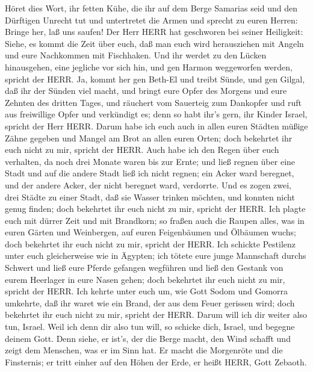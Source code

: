  Höret dies Wort, ihr fetten Kühe, die ihr auf dem Berge
Samarias seid und den Dürftigen Unrecht tut und untertretet die Armen
und sprecht zu euren Herren: Bringe her, laß uns saufen! 
Der Herr HERR hat geschworen bei seiner Heiligkeit: Siehe, es kommt die
Zeit über euch, daß man euch wird herausziehen mit Angeln und eure
Nachkommen mit Fischhaken.  Und ihr werdet zu den Lücken
hinausgehen, eine jegliche vor sich hin, und gen Harmon weggeworfen
werden, spricht der HERR.  Ja, kommt her gen Beth-El und
treibt Sünde, und gen Gilgal, daß ihr der Sünden viel macht, und bringt
eure Opfer des Morgens und eure Zehnten des dritten Tages, 
und räuchert vom Sauerteig zum Dankopfer und ruft aus freiwillige Opfer
und verkündigt es; denn so habt ihr's gern, ihr Kinder Israel, spricht
der Herr HERR.  Darum habe ich euch auch in allen euren
Städten müßige Zähne gegeben und Mangel am Brot an allen euren Orten;
doch bekehrtet ihr euch nicht zu mir, spricht der HERR. 
Auch habe ich den Regen über euch verhalten, da noch drei Monate waren
bis zur Ernte; und ließ regnen über eine Stadt und auf die andere Stadt
ließ ich nicht regnen; ein Acker ward beregnet, und der andere Acker,
der nicht beregnet ward, verdorrte.  Und es zogen zwei, drei
Städte zu einer Stadt, daß sie Wasser trinken möchten, und konnten nicht
genug finden; doch bekehrtet ihr euch nicht zu mir, spricht der HERR.
 Ich plagte euch mit dürrer Zeit und mit Brandkorn; so
fraßen auch die Raupen alles, was in euren Gärten und Weinbergen, auf
euren Feigenbäumen und Ölbäumen wuchs; doch bekehrtet ihr euch nicht zu
mir, spricht der HERR.  Ich schickte Pestilenz unter euch
gleicherweise wie in Ägypten; ich tötete eure junge Mannschaft durchs
Schwert und ließ eure Pferde gefangen wegführen und ließ den Gestank von
eurem Heerlager in eure Nasen gehen; doch bekehrtet ihr euch nicht zu
mir, spricht der HERR.  Ich kehrte unter euch um, wie Gott
Sodom und Gomorra umkehrte, daß ihr waret wie ein Brand, der aus dem
Feuer gerissen wird; doch bekehrtet ihr euch nicht zu mir, spricht der
HERR.  Darum will ich dir weiter also tun, Israel. Weil ich
denn dir also tun will, so schicke dich, Israel, und begegne deinem
Gott.  Denn siehe, er ist's, der die Berge macht, den Wind
schafft und zeigt dem Menschen, was er im Sinn hat. Er macht die
Morgenröte und die Finsternis; er tritt einher auf den Höhen der Erde,
er heißt HERR, Gott Zebaoth.

